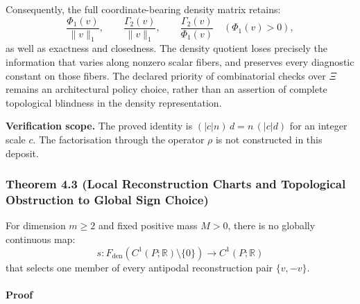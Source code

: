 \documentclass[
  10pt,
]{article}
\begin{document}
Consequently, the full coordinate-bearing density matrix retains: \protect\hypertarget{math-E0108-0134}{}{\[\frac{\Phi_1(v)}{\|v\|_1}, \qquad \frac{\Gamma_2(v)}{\|v\|_1}, \qquad \frac{\Gamma_2(v)}{\Phi_1(v)} \quad (\Phi_1(v) > 0),\]} as well as exactness and closedness. The density quotient loses precisely the information that varies along nonzero scalar fibers, and preserves every diagnostic constant on those fibers. The declared priority of combinatorial checks over \protect\hypertarget{math-E0002-0135}{}{\(\Xi\)} remains an architectural policy choice, rather than an assertion of complete topological blindness in the density representation.

\textbf{Verification scope.} The proved identity is \protect\hypertarget{math-E0109-0136}{}{\((|c| n)\, d = n\, (|c| d)\)} for an integer scale \protect\hypertarget{math-E0110-0137}{}{\(c\)}. The factorisation through the operator \protect\hypertarget{math-E0069-0138}{}{\(\rho\)} is not constructed in this deposit.

\subsubsection{Theorem 4.3 (Local Reconstruction Charts and Topological Obstruction to Global Sign Choice)}\label{theorem-4.3-local-reconstruction-charts-and-topological-obstruction-to-global-sign-choice}

For dimension \protect\hypertarget{math-E0111-0139}{}{\(m \ge 2\)} and fixed positive mass \protect\hypertarget{math-E0112-0140}{}{\(M > 0\)}, there is no globally continuous map: \protect\hypertarget{math-E0113-0141}{}{\[s: F_{\mathrm{den}}(C^1(P; \mathbb{R}) \setminus \{0\}) \to C^1(P; \mathbb{R})\]} that selects one member of every antipodal reconstruction pair \protect\hypertarget{math-E0068-0142}{}{\(\{v, -v\}\)}.

\paragraph{Proof}\label{proof-2}
\end{document}
